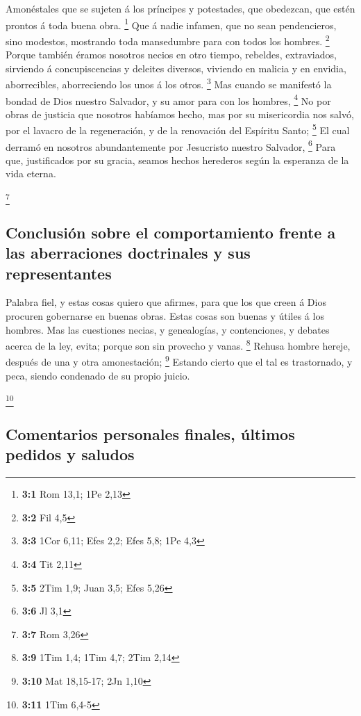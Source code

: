  Amonéstales que se sujeten á los príncipes y potestades,
que obedezcan, que estén prontos á toda buena obra. \footnote{\textbf{3:1}
  Rom 13,1; 1Pe 2,13}  Que á nadie infamen, que no sean
pendencieros, sino modestos, mostrando toda mansedumbre para con todos
los hombres. \footnote{\textbf{3:2} Fil 4,5}  Porque
también éramos nosotros necios en otro tiempo, rebeldes, extraviados,
sirviendo á concupiscencias y deleites diversos, viviendo en malicia y
en envidia, aborrecibles, aborreciendo los unos á los otros. \footnote{\textbf{3:3}
  1Cor 6,11; Efes 2,2; Efes 5,8; 1Pe 4,3}  Mas cuando se
manifestó la bondad de Dios nuestro Salvador, y su amor para con los
hombres, \footnote{\textbf{3:4} Tit 2,11}  No por obras de
justicia que nosotros habíamos hecho, mas por su misericordia nos salvó,
por el lavacro de la regeneración, y de la renovación del Espíritu
Santo; \footnote{\textbf{3:5} 2Tim 1,9; Juan 3,5; Efes 5,26}
 El cual derramó en nosotros abundantemente por Jesucristo
nuestro Salvador, \footnote{\textbf{3:6} Jl 3,1}  Para
que, justificados por su gracia, seamos hechos herederos según la
esperanza de la vida eterna.

\footnote{\textbf{3:7} Rom 3,26}

\hypertarget{conclusiuxf3n-sobre-el-comportamiento-frente-a-las-aberraciones-doctrinales-y-sus-representantes}{%
\subsection{Conclusión sobre el comportamiento frente a las aberraciones
doctrinales y sus
representantes}\label{conclusiuxf3n-sobre-el-comportamiento-frente-a-las-aberraciones-doctrinales-y-sus-representantes}}

 Palabra fiel, y estas cosas quiero que afirmes, para que
los que creen á Dios procuren gobernarse en buenas obras. Estas cosas
son buenas y útiles á los hombres.  Mas las cuestiones
necias, y genealogías, y contenciones, y debates acerca de la ley,
evita; porque son sin provecho y vanas. \footnote{\textbf{3:9} 1Tim 1,4;
  1Tim 4,7; 2Tim 2,14}  Rehusa hombre hereje, después de
una y otra amonestación; \footnote{\textbf{3:10} Mat 18,15-17; 2Jn 1,10}
 Estando cierto que el tal es trastornado, y peca, siendo
condenado de su propio juicio.

\footnote{\textbf{3:11} 1Tim 6,4-5}

\hypertarget{comentarios-personales-finales-uxfaltimos-pedidos-y-saludos}{%
\subsection{Comentarios personales finales, últimos pedidos y
saludos}\label{comentarios-personales-finales-uxfaltimos-pedidos-y-saludos}}

